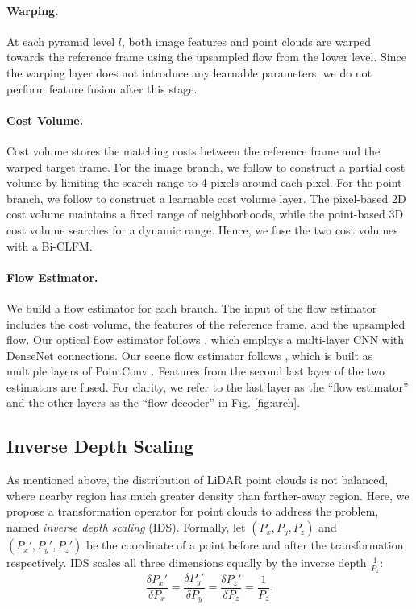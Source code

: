 \documentclass[10pt,twocolumn,letterpaper]{article}
\begin{document}
\vspace{-10pt}
\paragraph{Warping.} At each pyramid level $l$, both image features and point clouds are warped towards the reference frame using the upsampled flow from the lower level. Since the warping layer does not introduce any learnable parameters, we do not perform feature fusion after this stage.

\vspace{-10pt}
\paragraph{Cost Volume.} Cost volume stores the matching costs between the reference frame and the warped target frame. For the image branch, we follow \cite{sun2018pwc} to construct a partial cost volume by limiting the search range to 4 pixels around each pixel. For the point branch, we follow \cite{wu2019pointpwc} to construct a learnable cost volume layer. The pixel-based 2D cost volume maintains a fixed range of neighborhoods, while the point-based 3D cost volume searches for a dynamic range. Hence, we fuse the two cost volumes with a Bi-CLFM. 

\vspace{-10pt}
\paragraph{Flow Estimator.} We build a flow estimator for each branch. The input of the flow estimator includes the cost volume, the features of the reference frame, and the upsampled flow. Our optical flow estimator follows \cite{sun2018pwc}, which employs a multi-layer CNN with DenseNet \cite{huang2017densenet} connections. Our scene flow estimator follows \cite{wu2019pointpwc}, which is built as multiple layers of PointConv \cite{wu2019pointconv}. Features from the second last layer of the two estimators are fused. For clarity, we refer to the last layer as the ``flow estimator'' and the other layers as the ``flow decoder'' in Fig. \ref{fig:arch}.

\subsection{Inverse Depth Scaling}
\label{sec:ids}

As mentioned above, the distribution of LiDAR point clouds is not balanced, where nearby region has much greater density than farther-away region. Here, we propose a transformation operator for point clouds to address the problem, named \textit{inverse depth scaling} (IDS). Formally, let $(P_x, P_y, P_z)$ and $(P_x', P_y', P_z')$ be the coordinate of a point before and after the transformation respectively. IDS scales all three dimensions equally by the inverse depth $\frac{1}{P_z}$:
\begin{equation}
    \frac{\delta P_x'}{\delta P_x} = \frac{\delta P_y'}{\delta P_y} = \frac{\delta P_z'}{\delta P_z} = \frac{1}{P_z}.
\end{equation}
\end{document}
